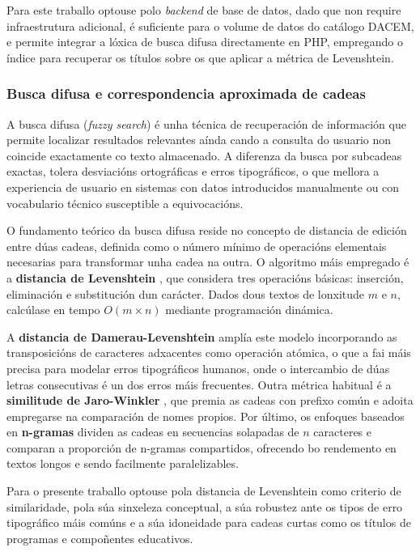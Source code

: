 \documentclass[%
    a4paper,               %
    twoside,               %
    10pt,                  %
]{article}                 %
\begin{document}
Para este traballo optouse polo \textit{backend} de base de datos, dado que non require infraestrutura adicional, é suficiente para o volume de datos do catálogo DACEM, e permite integrar a lóxica de busca difusa directamente en PHP, empregando o índice para recuperar os títulos sobre os que aplicar a métrica de Levenshtein.

\subsubsection{Busca difusa e correspondencia aproximada de cadeas}
\label{anx:busca_difusa}

A busca difusa (\textit{fuzzy search}) é unha técnica de recuperación de información que permite localizar resultados relevantes aínda cando a consulta do usuario non coincide exactamente co texto almacenado. A diferenza da busca por subcadeas exactas, tolera desviacións ortográficas e erros tipográficos, o que mellora a experiencia de usuario en sistemas con datos introducidos manualmente ou con vocabulario técnico susceptible a equivocacións.

O fundamento teórico da busca difusa reside no concepto de distancia de edición entre dúas cadeas, definida como o número mínimo de operacións elementais necesarias para transformar unha cadea na outra. O algoritmo máis empregado é a \textbf{distancia de Levenshtein} \cite{levenshtein}, que considera tres operacións básicas: inserción, eliminación e substitución dun carácter. Dados dous textos de lonxitude $m$ e $n$, calcúlase en tempo $O(m \times n)$ mediante programación dinámica.

A \textbf{distancia de Damerau-Levenshtein} \cite{damerau} amplía este modelo incorporando as transposicións de caracteres adxacentes como operación atómica, o que a fai máis precisa para modelar erros tipográficos humanos, onde o intercambio de dúas letras consecutivas é un dos erros máis frecuentes. Outra métrica habitual é a \textbf{similitude de Jaro-Winkler} \cite{winkler}, que premia as cadeas con prefixo común e adoita empregarse na comparación de nomes propios. Por último, os enfoques baseados en \textbf{n-gramas} \cite{ukkonen} dividen as cadeas en secuencias solapadas de $n$ caracteres e comparan a proporción de n-gramas compartidos, ofrecendo bo rendemento en textos longos e sendo facilmente paralelizables.

Para o presente traballo optouse pola distancia de Levenshtein como criterio de similaridade, pola súa sinxeleza conceptual, a súa robustez ante os tipos de erro tipográfico máis comúns e a súa idoneidade para cadeas curtas como os títulos de programas e compoñentes educativos.
\end{document}
